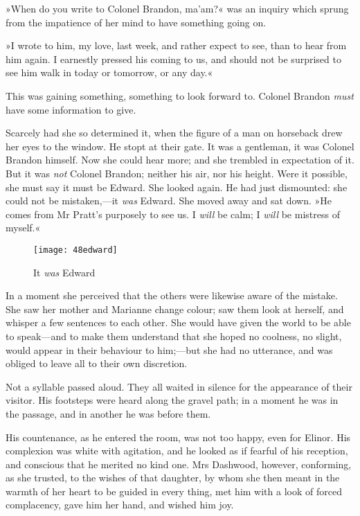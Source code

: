 »When do you write to Colonel Brandon, ma’am?« was an inquiry which sprung from the impatience of her mind to have something going on.

»I wrote to him, my love, last week, and rather expect to see, than to hear from him again. I earnestly pressed his coming to us, and should not be surprised to see him walk in today or tomorrow, or any day.«

This was gaining something, something to look forward to. Colonel Brandon \textit{must} have some information to give.

Scarcely had she so determined it, when the figure of a man on horseback drew her eyes to the window. He stopt at their gate. It was a gentleman, it was Colonel Brandon himself. Now she could hear more; and she trembled in expectation of it. But it was \textit{not} Colonel Brandon; neither his air, nor his height. Were it possible, she must say it must be Edward. She looked again. He had just dismounted: she could not be mistaken,—it \textit{was} Edward. She moved away and sat down. »He comes from Mr Pratt’s purposely to see us. I \textit{will} be calm; I \textit{will} be mistress of myself.«

\begin{figure}[tbph]
\centering
\texttt{[image: 48edward]}
\caption{It \textit{was} Edward}
\end{figure}

In a moment she perceived that the others were likewise aware of the mistake. She saw her mother and Marianne change colour; saw them look at herself, and whisper a few sentences to each other. She would have given the world to be able to speak—and to make them understand that she hoped no coolness, no slight, would appear in their behaviour to him;—but she had no utterance, and was obliged to leave all to their own discretion.

Not a syllable passed aloud. They all waited in silence for the appearance of their visitor. His footsteps were heard along the gravel path; in a moment he was in the passage, and in another he was before them.

His countenance, as he entered the room, was not too happy, even for Elinor. His complexion was white with agitation, and he looked as if fearful of his reception, and conscious that he merited no kind one. Mrs Dashwood, however, conforming, as she trusted, to the wishes of that daughter, by whom she then meant in the warmth of her heart to be guided in every thing, met him with a look of forced complacency, gave him her hand, and wished him joy.

